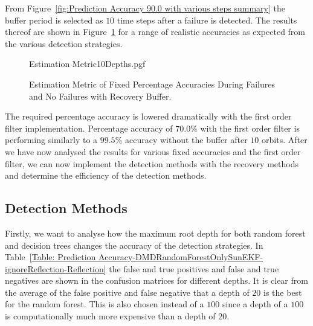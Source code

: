 \documentclass[letterpaper, 10 pt, conference]{ieeeconf}  %
\begin{document}
From Figure~\ref{fig:Prediction Accuracy 90.0 with various steps summary} the buffer period is selected as $10$ time steps after a failure is detected. The results thereof are shown in Figure~\ref{fig:Estimation Accuracy EKF-ignore with Recovery Buffer} for a range of realistic accuracies as expected from the various detection strategies. 

\begin{figure}[!htb]
	\begin{center}
		{Estimation Metric10Depths.pgf}
	\end{center}
	\caption[Estimation Metric of Fixed Percentage Accuracies During Failures and No Failures with Recovery Buffer]{Estimation Metric of Fixed Percentage Accuracies During Failures and No Failures with Recovery Buffer.}
	\label{fig:Estimation Accuracy EKF-ignore with Recovery Buffer}
\end{figure}

The required percentage accuracy is lowered dramatically with the first order filter implementation. Percentage accuracy of $70.0\%$ with the first order filter is performing similarly to a $99.5\%$ accuracy without the buffer after $10$ orbits. After we have now analysed the results for various fixed accuracies and the first order filter, we can now implement the detection methods with the recovery methods and determine the efficiency of the detection methods.

\subsection{Detection Methods}
Firstly, we want to analyse how the maximum root depth for both random forest and decision trees changes the accuracy of the detection strategies. In Table~\ref{Table: Prediction Accuracy-DMDRandomForestOnlySunEKF-ignoreReflection-Reflection} the false and true positives and false and true negatives are shown in the confusion matrices for different depths. It is clear from the average of the false positive and false negative that a depth of $20$ is the best for the random forest. This is also chosen instead of a $100$ since a depth of a $100$ is computationally much more expensive than a depth of $20$.
\end{document}
